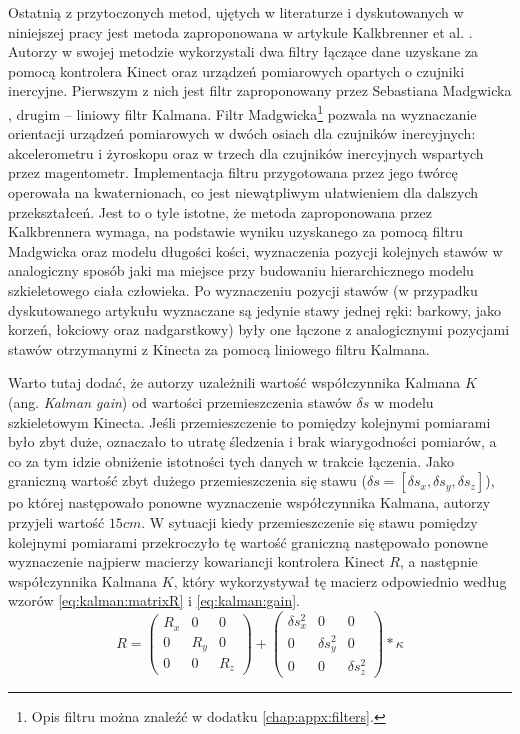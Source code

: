 Ostatnią z przytoczonych metod, ujętych w literaturze i dyskutowanych w niniejszej pracy jest metoda zaproponowana w artykule Kalkbrenner et al. \cite{Kalkbrenner2014}. Autorzy w swojej metodzie wykorzystali dwa filtry łączące dane uzyskane za pomocą kontrolera Kinect oraz urządzeń pomiarowych opartych o czujniki inercyjne. Pierwszym z nich jest filtr zaproponowany przez Sebastiana Madgwicka \cite{Kalkbrenner2014}, drugim -- liniowy filtr Kalmana. Filtr Madgwicka\footnote{Opis filtru można znaleźć w dodatku \ref{chap:appx:filters}.} pozwala na wyznaczanie orientacji urządzeń pomiarowych w dwóch osiach dla czujników inercyjnych: akcelerometru i żyroskopu oraz w trzech dla czujników inercyjnych wspartych przez magentometr. Implementacja filtru przygotowana przez jego twórcę operowała na kwaternionach, co jest niewątpliwym ułatwieniem dla dalszych przekształceń. Jest to o tyle istotne, że metoda zaproponowana przez Kalkbrennera wymaga, na podstawie wyniku uzyskanego za pomocą filtru Madgwicka oraz modelu długości kości, wyznaczenia pozycji kolejnych stawów  w analogiczny sposób jaki ma miejsce przy budowaniu hierarchicznego modelu szkieletowego ciała człowieka. Po wyznaczeniu pozycji stawów (w przypadku dyskutowanego artykułu wyznaczane są jedynie stawy jednej ręki: barkowy, jako korzeń, łokciowy oraz nadgarstkowy) były one łączone z analogicznymi pozycjami stawów otrzymanymi z Kinecta za pomocą liniowego filtru Kalmana. 
		
Warto tutaj dodać, że autorzy uzależnili wartość współczynnika Kalmana $K$ (ang. \emph{Kalman gain}) od wartości przemieszczenia stawów $\delta s$ w modelu szkieletowym Kinecta. Jeśli przemieszczenie to pomiędzy kolejnymi pomiarami było zbyt duże, oznaczało to utratę śledzenia i brak wiarygodności pomiarów, a co za tym idzie obniżenie istotności tych danych w trakcie łączenia. Jako graniczną wartość zbyt dużego przemieszczenia się stawu ($\delta s = [\delta s_x, \delta s_y, \delta s_z]$), po której następowało ponowne wyznaczenie współczynnika Kalmana, autorzy przyjeli wartość $15cm$. W sytuacji kiedy przemieszczenie się stawu pomiędzy kolejnymi pomiarami przekroczyło tę wartość graniczną następowało ponowne wyznaczenie najpierw macierzy kowariancji kontrolera Kinect $R$, a następnie współczynnika Kalmana $K$, który wykorzystywał tę macierz odpowiednio według wzorów \eqref{eq:kalman:matrixR} i \eqref{eq:kalman:gain}.
\begin{equation}
	R = 
	\begin{pmatrix}
		R_x & 0   & 0   \\
		0   & R_y & 0   \\
		0   & 0   & R_z 
	\end{pmatrix} +
	\begin{pmatrix}
		\delta s_x^2 & 0            & 0            \\
		0            & \delta s_y^2 & 0            \\
		0            & 0            & \delta s_z^2 
	\end{pmatrix} * \kappa
	\label{eq:kalman:matrixR}
\end{equation}
		
